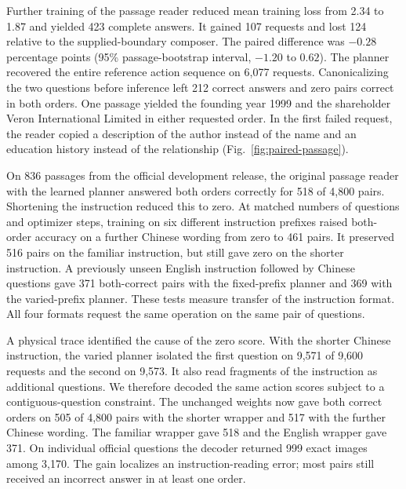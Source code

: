 \documentclass[12pt,a4paper]{article}
\providecommand{\DIFadd}[1]{{\protect\color{blue} \sf #1}} %
\begin{document}
\DIFadd{Further training of the passage reader reduced mean training loss from 2.34 to 1.87 and yielded 423 complete answers. It gained 107 requests and lost 124 relative to the supplied-boundary composer. The paired difference was $-0.28$ percentage points (95\% passage-bootstrap interval, $-1.20$ to $0.62$). The planner recovered the entire reference action sequence on 6,077 requests. Canonicalizing the two questions before inference left 212 correct answers and zero pairs correct in both orders. One passage yielded the founding year 1999 and the shareholder Veron International Limited in either requested order. In the first failed request, the reader copied a description of the author instead of the name and an education history instead of the relationship (Fig.~\ref{fig:paired-passage}).
}

\DIFadd{On 836 passages from the official development release, the original passage reader with the learned planner answered both orders correctly for 518 of 4,800 pairs. Shortening the instruction reduced this to zero. At matched numbers of questions and optimizer steps, training on six different instruction prefixes raised both-order accuracy on a further Chinese wording from zero to 461 pairs. It preserved 516 pairs on the familiar instruction, but still gave zero on the shorter instruction. A previously unseen English instruction followed by Chinese questions gave 371 both-correct pairs with the fixed-prefix planner and 369 with the varied-prefix planner. These tests measure transfer of the instruction format. All four formats request the same operation on the same pair of questions.
}

\DIFadd{A physical trace identified the cause of the zero score. With the shorter Chinese instruction, the varied planner isolated the first question on 9,571 of 9,600 requests and the second on 9,573. It also read fragments of the instruction as additional questions. We therefore decoded the same action scores subject to a contiguous-question constraint. The unchanged weights now gave both correct orders on 505 of 4,800 pairs with the shorter wrapper and 517 with the further Chinese wording. The familiar wrapper gave 518 and the English wrapper gave 371. On individual official questions the decoder returned 999 exact images among 3,170. The gain localizes an instruction-reading error; most pairs still received an incorrect answer in at least one order.
}
\end{document}

